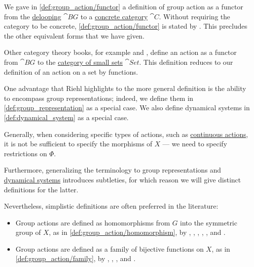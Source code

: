 \begin{remark}\label{rem:group_action_category}
  We gave in \cref{def:group_action/functor} a definition of group action as a functor from the \hyperref[def:monoid_delooping]{delooping} \( \cat{B} G \) to a \hyperref[rem:concrete_categories]{concrete category} \( \cat{C} \). Without requiring the category to be concrete, \cref{def:group_action/functor} is stated by . This precludes the other equivalent forms that we have given.

  Other category theory books, for example \cite[example 1.2.8]{Leinster2014BasicCategoryTheory} and \cite[example 1.3.10]{Perrone2024StartingCategoryTheory}, define an action as a functor from \( \cat{B} G \) to the \hyperref[def:category_of_small_sets]{category of small sets} \( \cat{Set} \). This definition reduces to our definition of an action on a set by functions.

  One advantage that Riehl highlights to the more general definition is the ability to encompass group representations; indeed, we define them in \cref{def:group_representation} as a special case. We also define dynamical systems in \cref{def:dynamical_system} as a special case.

  Generally, when considering specific types of actions, such as \hyperref[def:continuous_monoid_action]{continuous actions}, it is not be sufficient to specify the morphisms of \( X \) --- we need to specify restrictions on \( \Phi \).

  Furthermore, generalizing the terminology to group representations and \hyperref[def:dynamical_system]{dynamical systems} introduces subtleties, for which reason we will give distinct definitions for the latter.

  Nevertheless, simplistic definitions are often preferred in the literature:
  \begin{itemize}
    \item Group actions are defined as homomorphisms from \( G \) into the symmetric group of \( X \), as in \cref{def:group_action/homomorphism}, by
    ,
    ,
    ,
    ,
    ,
     and
    .

    \item Group actions are defined as a family of bijective functions on \( X \), as in \cref{def:group_action/family}, by
    ,
    ,
    ,
     and
    .
  \end{itemize}
\end{remark}

